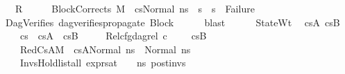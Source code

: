 \begin{isabellebody}
\ \ \ {\isachardoublequoteopen}R{\isachardoublequoteclose}\isanewline
%
\isadelimproof
%
\endisadelimproof
%
\isatagproof
{}\isamarkupfalse%
\ {\isacharminus}{\kern0pt}\isanewline
\ \ \isamarkupfalse%
\ BlockCorrect{\isacharcolon}{\kern0pt}{\isachardoublequoteopen}{\isasymAnd}s{}{\isacharprime}{\kern0pt}{\isachardot}{\kern0pt}\ M{\isacharcomma}{\kern0pt}{\isasymLambda}{\isacharcomma}{\kern0pt}{\isasymGamma}{\isacharcomma}{\kern0pt}{\isasymOmega}\ {\isasymturnstile}\ {\isasymlangle}cs{\isacharcomma}{\kern0pt}Normal\ ns{}{\isasymrangle}\ {\isacharbrackleft}{\kern0pt}{\isasymrightarrow}{\isacharbrackright}{\kern0pt}\ s{}{\isacharprime}{\kern0pt}\ {\isasymLongrightarrow}\ s{}{\isacharprime}{\kern0pt}\ {\isasymnoteq}\ Failure{\isachardoublequoteclose}\isanewline
\ \ \ \ \isamarkupfalse%
\ DagVerifies\ dag{\isacharunderscore}{\kern0pt}verifies{\isacharunderscore}{\kern0pt}propagate{\isacharunderscore}{\kern0pt}{}\ Block\isanewline
\ \ \ \ \isamarkupfalse%
\ blast\ \ \isanewline
\ \ \isamarkupfalse%
\ StateWt{}\ \isamarkupfalse%
\ csA\ csB\ \ \isanewline
\ \ \ \ {\isachardoublequoteopen}cs\ {\isacharequal}{\kern0pt}\ csA\ {\isacharat}{\kern0pt}\ csB{\isachardoublequoteclose}\ \isanewline
\ \ \ \ Rel{}{\isacharcolon}{\kern0pt}{\isachardoublequoteopen}cfg{\isacharunderscore}{\kern0pt}dag{\isacharunderscore}{\kern0pt}rel\ c\ {\isacharbrackleft}{\kern0pt}{\isacharbrackright}{\kern0pt}\ {\isacharbrackleft}{\kern0pt}{\isacharbrackright}{\kern0pt}\ {\isacharbrackleft}{\kern0pt}{\isacharbrackright}{\kern0pt}\ {\isacharbrackleft}{\kern0pt}{\isacharbrackright}{\kern0pt}\ csB{\isachardoublequoteclose}\ \ \isanewline
\ \ \ \ RedCsA{\isacharcolon}{\kern0pt}{\isachardoublequoteopen}{\isacharparenleft}{\kern0pt}M{\isacharcomma}{\kern0pt}{\isasymLambda}{\isacharcomma}{\kern0pt}{\isasymGamma}{\isacharcomma}{\kern0pt}{\isasymOmega}\ {\isasymturnstile}\ {\isasymlangle}csA{\isacharcomma}{\kern0pt}Normal\ ns{}{\isasymrangle}\ {\isacharbrackleft}{\kern0pt}{\isasymrightarrow}{\isacharbrackright}{\kern0pt}\ Normal\ ns{}{\isacharparenright}{\kern0pt}{\isachardoublequoteclose}\ \isanewline
\ \ \ \ InvsHold{}{\isacharcolon}{\kern0pt}{\isachardoublequoteopen}list{\isacharunderscore}{\kern0pt}all\ {\isacharparenleft}{\kern0pt}expr{\isacharunderscore}{\kern0pt}sat\ {\isasymLambda}\ {\isasymGamma}\ {\isasymOmega}\ ns{}{\isacharparenright}{\kern0pt}\ post{\isacharunderscore}{\kern0pt}invs{\isachardoublequoteclose}\isanewline

\end{isabellebody}

